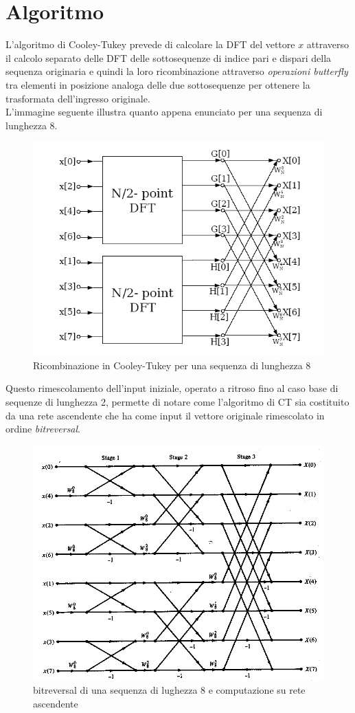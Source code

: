 \documentclass[12pt,a4paper,oneside,openright]{article}
\begin{document}
\section{Algoritmo}
L'algoritmo di Cooley-Tukey prevede di calcolare la DFT del vettore $x$ attraverso il calcolo separato delle DFT delle sottosequenze di indice pari e dispari della sequenza originaria e quindi la loro ricombinazione attraverso \emph{operazioni butterfly} tra elementi in posizione analoga delle due sottosequenze per ottenere la trasformata dell'ingresso originale.\\
L'immagine seguente illustra quanto appena enunciato per una sequenza di lunghezza 8.
\begin{figure}[H] 
  \centering
      \includegraphics[width=\textwidth]{immagini/cooley-tukey}
  \caption{Ricombinazione in Cooley-Tukey per una sequenza di lunghezza 8}
\end{figure}
Questo rimescolamento dell'input iniziale, operato a ritroso fino al caso base di sequenze di lunghezza 2, permette di notare come l'algoritmo di CT sia costituito da una rete ascendente che ha come input il vettore originale rimescolato in ordine \emph{bitreversal}.
\begin{figure}[H] 
  \centering
      \includegraphics[width=\textwidth]{immagini/alg-asc}
  \caption{bitreversal di una sequenza di lughezza 8 e computazione su rete ascendente}
\end{figure}
\end{document}
